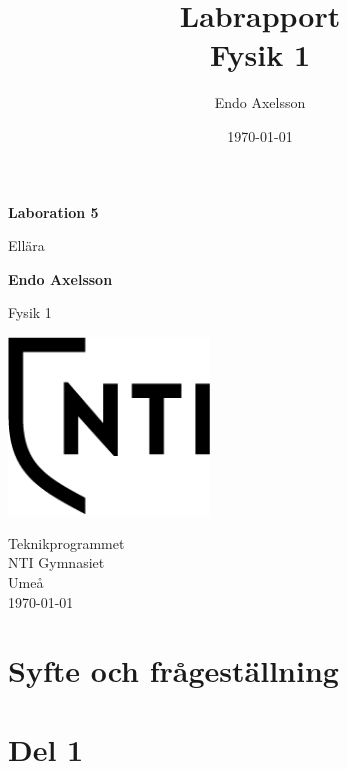 \documentclass[11pt]{article}
\title{Labrapport \\ \small Fysik 1}
\author{Endo Axelsson}
\date{\today}
\begin{document}
    \begin{titlepage}
        \begin{center}
            \vspace*{1cm}

            \Huge
            \textbf{Laboration 5}

            \vspace{0.5cm}
            \LARGE
            Ellära

            \vspace{1.5cm}

            \textbf{Endo Axelsson}

            \vfill


            Fysik 1

            \vspace{0.8cm}

            \includegraphics[width=0.4\textwidth]{../NTI Gymnasiet_Symbol_print_svart.png}

            \Large
            Teknikprogrammet\\
            NTI Gymnasiet\\
            Umeå\\
            \today

        \end{center}
    \end{titlepage}
    \section{Syfte och frågeställning}


    \section{Del 1}
\end{document}
